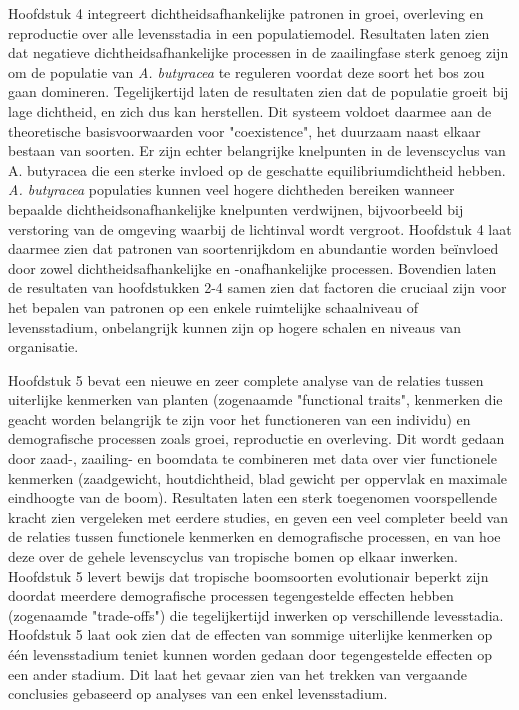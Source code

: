 \documentclass[b5paper,justified]{tufte-book} %
\begin{document}
\begin{fullwidth}
Hoofdstuk 4 integreert dichtheidsafhankelijke patronen in groei, overleving en reproductie over alle levensstadia in een populatiemodel. Resultaten laten zien dat negatieve dichtheidsafhankelijke processen in de zaailingfase sterk genoeg zijn om de populatie van \textit{A. butyracea} te reguleren voordat deze soort het bos zou gaan domineren. Tegelijkertijd laten de resultaten zien dat de populatie groeit bij lage dichtheid, en zich dus kan herstellen. Dit systeem voldoet daarmee aan de theoretische basisvoorwaarden voor "coexistence", het duurzaam naast elkaar bestaan van soorten. Er zijn echter belangrijke knelpunten in de levenscyclus van A. butyracea die een sterke invloed op de geschatte equilibriumdichtheid hebben. \textit{A. butyracea} populaties kunnen veel hogere dichtheden bereiken wanneer bepaalde dichtheidsonafhankelijke knelpunten verdwijnen, bijvoorbeeld bij verstoring van de omgeving waarbij de lichtinval wordt vergroot. Hoofdstuk 4 laat daarmee zien dat patronen van soortenrijkdom en abundantie worden be\"invloed door zowel dichtheidsafhankelijke en -onafhankelijke processen. Bovendien laten de resultaten van hoofdstukken 2-4 samen zien dat factoren die cruciaal zijn voor het bepalen van patronen op een enkele ruimtelijke schaalniveau of levensstadium, onbelangrijk kunnen zijn op hogere schalen en niveaus van organisatie.

Hoofdstuk 5 bevat een nieuwe en zeer complete analyse van de relaties tussen uiterlijke kenmerken van planten (zogenaamde "functional traits", kenmerken die geacht worden belangrijk te zijn voor het functioneren van een individu) en demografische processen zoals groei, reproductie en overleving. Dit wordt gedaan door zaad-, zaailing- en boomdata te combineren met data over vier functionele kenmerken (zaadgewicht, houtdichtheid, blad gewicht per oppervlak en maximale eindhoogte van de boom). Resultaten laten een sterk toegenomen voorspellende kracht zien vergeleken met eerdere studies, en geven een veel completer beeld van de relaties tussen functionele kenmerken en demografische processen, en van hoe deze over de gehele levenscyclus van tropische bomen op elkaar inwerken. Hoofdstuk 5 levert bewijs dat tropische boomsoorten evolutionair beperkt zijn doordat meerdere demografische processen tegengestelde effecten hebben (zogenaamde "trade-offs") die tegelijkertijd inwerken op verschillende levesstadia. Hoofdstuk 5 laat ook zien dat de effecten van sommige uiterlijke kenmerken op \'e\'en levensstadium teniet kunnen worden gedaan door tegengestelde effecten op een ander stadium. Dit laat het gevaar zien van het trekken van vergaande conclusies gebaseerd op analyses van een enkel levensstadium.


\end{fullwidth}
\end{document}

